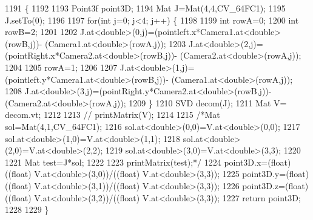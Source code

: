 \begin{DoxyCode}
1191                                                                                                      \{
1192 
1193       Point3f point3D;
1194       Mat J=Mat(4,4,CV\_64FC1);
1195       J.setTo(0);
1196                 
1197       \textcolor{keywordflow}{for}(\textcolor{keywordtype}{int} j=0; j<4; j++) \{
1198 
1199             \textcolor{keywordtype}{int} rowA=0;
1200             \textcolor{keywordtype}{int} rowB=2;
1201 
1202             J.at<\textcolor{keywordtype}{double}>(0,j)=(pointleft.x*Camera1.at<\textcolor{keywordtype}{double}>(rowB,j))- (Camera1.at<\textcolor{keywordtype}{double}>(rowA,j));
1203             J.at<\textcolor{keywordtype}{double}>(2,j)=(pointRight.x*Camera2.at<\textcolor{keywordtype}{double}>(rowB,j))- (Camera2.at<\textcolor{keywordtype}{double}>(rowA,j));
1204 
1205             rowA=1;
1206             
1207             J.at<\textcolor{keywordtype}{double}>(1,j)=(pointleft.y*Camera1.at<\textcolor{keywordtype}{double}>(rowB,j))- (Camera1.at<\textcolor{keywordtype}{double}>(rowA,j));
1208             J.at<\textcolor{keywordtype}{double}>(3,j)=(pointRight.y*Camera2.at<\textcolor{keywordtype}{double}>(rowB,j))- (Camera2.at<\textcolor{keywordtype}{double}>(rowA,j));
1209         \}
1210         SVD decom(J);
1211         Mat V= decom.vt;
1212 
1213        \textcolor{comment}{// printMatrix(V);}
1214         
1215         \textcolor{comment}{/*Mat sol=Mat(4,1,CV\_64FC1);}
1216 \textcolor{comment}{        sol.at<double>(0,0)=V.at<double>(0,0);}
1217 \textcolor{comment}{        sol.at<double>(1,0)=V.at<double>(1,1);}
1218 \textcolor{comment}{        sol.at<double>(2,0)=V.at<double>(2,2);}
1219 \textcolor{comment}{        sol.at<double>(3,0)=V.at<double>(3,3);}
1220 \textcolor{comment}{        }
1221 \textcolor{comment}{        Mat test=J*sol;}
1222 \textcolor{comment}{        }
1223 \textcolor{comment}{        printMatrix(test);*/}
1224         point3D.x=(float) ((\textcolor{keywordtype}{float}) V.at<\textcolor{keywordtype}{double}>(3,0))/((float) V.at<\textcolor{keywordtype}{double}>(3,3));
1225         point3D.y=(float) ((\textcolor{keywordtype}{float}) V.at<\textcolor{keywordtype}{double}>(3,1))/((float) V.at<\textcolor{keywordtype}{double}>(3,3));     
1226         point3D.z=(float) ((\textcolor{keywordtype}{float}) V.at<\textcolor{keywordtype}{double}>(3,2))/((float) V.at<\textcolor{keywordtype}{double}>(3,3));
1227         \textcolor{keywordflow}{return} point3D;
1228 
1229 \}
\end{DoxyCode}
